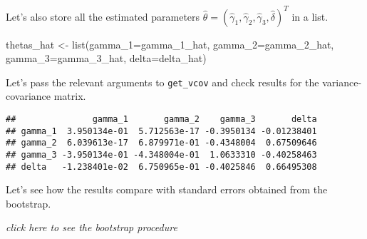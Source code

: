 \documentclass[
]{article}
\newenvironment{Shaded}{\begin{snugshade}}{\end{snugshade}}
\newcommand{\AttributeTok}[1]{\textcolor[rgb]{0.77,0.63,0.00}{#1}}
\newcommand{\FunctionTok}[1]{\textcolor[rgb]{0.00,0.00,0.00}{#1}}
\newcommand{\NormalTok}[1]{#1}
\newcommand{\OtherTok}[1]{\textcolor[rgb]{0.56,0.35,0.01}{#1}}
\newcommand{\SpecialCharTok}[1]{\textcolor[rgb]{0.00,0.00,0.00}{#1}}
\begin{document}
Let's also store all the estimated parameters
\(\hat{\theta}=(\hat{\gamma}_1,\hat{\gamma}_2,\hat{\gamma}_3,\hat{\delta})^T\)
in a list.

\begin{Shaded}
\begin{Highlighting}[]
\NormalTok{thetas\_hat }\OtherTok{\textless{}{-}} \FunctionTok{list}\NormalTok{(}\AttributeTok{gamma\_1=}\NormalTok{gamma\_1\_hat,}
                  \AttributeTok{gamma\_2=}\NormalTok{gamma\_2\_hat,}
                  \AttributeTok{gamma\_3=}\NormalTok{gamma\_3\_hat,}
                  \AttributeTok{delta=}\NormalTok{delta\_hat)}
\end{Highlighting}
\end{Shaded}

Let's pass the relevant arguments to \texttt{get\_vcov} and check
results for the variance-covariance matrix.

\begin{Shaded}
\end{Shaded}

\begin{verbatim}
##               gamma_1       gamma_2    gamma_3       delta
## gamma_1  3.950134e-01  5.712563e-17 -0.3950134 -0.01238401
## gamma_2  6.039613e-17  6.879971e-01 -0.4348004  0.67509646
## gamma_3 -3.950134e-01 -4.348004e-01  1.0633310 -0.40258463
## delta   -1.238401e-02  6.750965e-01 -0.4025846  0.66495308
\end{verbatim}

Let's see how the results compare with standard errors obtained from the
bootstrap.

\emph{click here to see the bootstrap procedure}
\end{document}
